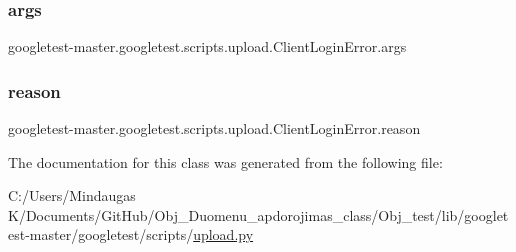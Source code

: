 \subsubsection{\texorpdfstring{args}{args}}
{\footnotesize\ttfamily googletest-\/master.\+googletest.\+scripts.\+upload.\+Client\+Login\+Error.\+args}

\mbox{\label{classgoogletest-master_1_1googletest_1_1scripts_1_1upload_1_1_client_login_error_a4ac732e91de6e994f39885c030c4eae3}} 
\subsubsection{\texorpdfstring{reason}{reason}}
{\footnotesize\ttfamily googletest-\/master.\+googletest.\+scripts.\+upload.\+Client\+Login\+Error.\+reason}



The documentation for this class was generated from the following file\+:\begin{DoxyCompactItemize}
\item 
C\+:/\+Users/\+Mindaugas K/\+Documents/\+Git\+Hub/\+Obj\+\_\+\+Duomenu\+\_\+apdorojimas\+\_\+class/\+Obj\+\_\+test/lib/googletest-\/master/googletest/scripts/\mbox{\hyperlink{_obj__test_2lib_2googletest-master_2googletest_2scripts_2upload_8py}{upload.\+py}}\end{DoxyCompactItemize}
